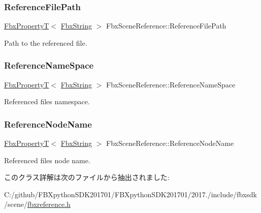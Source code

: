 \subsubsection{\texorpdfstring{Reference\+File\+Path}{ReferenceFilePath}}
{\footnotesize\ttfamily \hyperlink{class_fbx_property_t}{Fbx\+PropertyT}$<$ \hyperlink{class_fbx_string}{Fbx\+String} $>$ Fbx\+Scene\+Reference\+::\+Reference\+File\+Path}



Path to the referenced file. 

\mbox{\label{class_fbx_scene_reference_aa29e70b4a27c20a537c4daa567624821}} 
\subsubsection{\texorpdfstring{Reference\+Name\+Space}{ReferenceNameSpace}}
{\footnotesize\ttfamily \hyperlink{class_fbx_property_t}{Fbx\+PropertyT}$<$ \hyperlink{class_fbx_string}{Fbx\+String} $>$ Fbx\+Scene\+Reference\+::\+Reference\+Name\+Space}



Referenced file\textquotesingle{}s namespace. 

\mbox{\label{class_fbx_scene_reference_a322d144d3a3e9d641132c7f65c924c2b}} 
\subsubsection{\texorpdfstring{Reference\+Node\+Name}{ReferenceNodeName}}
{\footnotesize\ttfamily \hyperlink{class_fbx_property_t}{Fbx\+PropertyT}$<$ \hyperlink{class_fbx_string}{Fbx\+String} $>$ Fbx\+Scene\+Reference\+::\+Reference\+Node\+Name}



Referenced file\textquotesingle{}s node name. 



このクラス詳解は次のファイルから抽出されました\+:\begin{DoxyCompactItemize}
\item 
C\+:/github/\+F\+B\+Xpython\+S\+D\+K201701/\+F\+B\+Xpython\+S\+D\+K201701/2017./include/fbxsdk/scene/\hyperlink{fbxreference_8h}{fbxreference.\+h}\end{DoxyCompactItemize}
